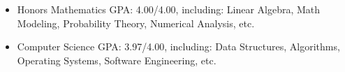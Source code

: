 
\begin{itemize}[nosep]
  \item Honors Mathematics GPA: 4.00/4.00, including:
  Linear Algebra, Math Modeling, Probability Theory, Numerical Analysis, etc.
  \item Computer Science GPA: 3.97/4.00, including:
  Data Structures, Algorithms, Operating Systems, Software Engineering, etc.
\end{itemize}